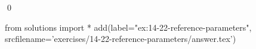 
\begin{ex}
  \label{ex:14-22-reference-parameters}
  
  \qed
\end{ex}
\begin{python0}
from solutions import *
add(label="ex:14-22-reference-parameters",
    srcfilename='exercises/14-22-reference-parameters/answer.tex')
\end{python0}

